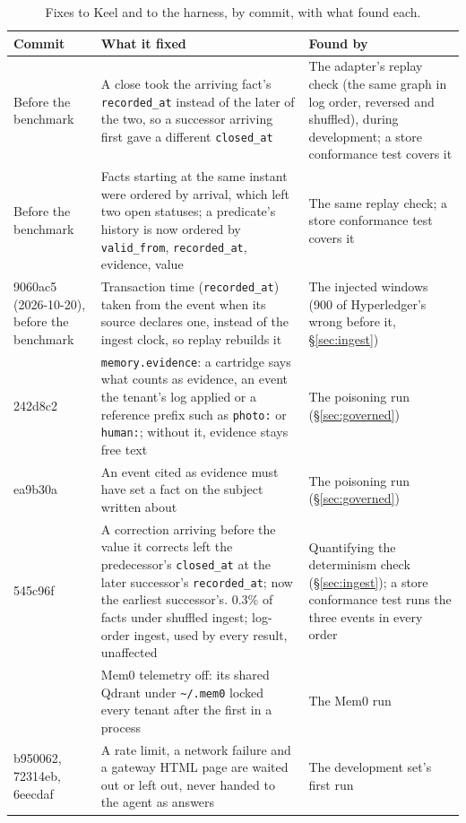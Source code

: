 \documentclass[sigconf, nonacm]{acmart}
\newcommand{\code}[1]{\texttt{#1}}
\begin{document}
\begin{table}[t]
\caption{Fixes to Keel and to the harness, by commit, with what found each.}
\label{tab:fixes}
\centering
\footnotesize
\begin{tabularx}{\textwidth}{P{1.1in} L L}
\toprule
Commit & What it fixed & Found by \\
\midrule
Before the benchmark & A close took the arriving fact's \code{recorded\_at} instead of the later of the two, so a successor arriving first gave a different \code{closed\_at} & The adapter's replay check (the same graph in log order, reversed and shuffled), during development; a store conformance test covers it \\
\addlinespace
Before the benchmark & Facts starting at the same instant were ordered by arrival, which left two open statuses; a predicate's history is now ordered by \code{valid\_from}, \code{recorded\_at}, evidence, value & The same replay check; a store conformance test covers it \\
\addlinespace
9060ac5 (2026-10-20), before the benchmark & Transaction time (\code{recorded\_at}) taken from the event when its source declares one, instead of the ingest clock, so replay rebuilds it & The injected windows (900 of Hyperledger's wrong before it, \S\ref{sec:ingest}) \\
\addlinespace
242d8c2 & \code{memory.evidence}: a cartridge says what counts as evidence, an event the tenant's log applied or a reference prefix such as \code{photo:} or \code{human:}; without it, evidence stays free text & The poisoning run (\S\ref{sec:governed}) \\
\addlinespace
ea9b30a & An event cited as evidence must have set a fact on the subject written about & The poisoning run (\S\ref{sec:governed}) \\
\addlinespace
545c96f & A correction arriving before the value it corrects left the predecessor's \code{closed\_at} at the later successor's \code{recorded\_at}; now the earliest successor's. 0.3\% of facts under shuffled ingest; log-order ingest, used by every result, unaffected & Quantifying the determinism check (\S\ref{sec:ingest}); a store conformance test runs the three events in every order \\
 & Mem0 telemetry off: its shared Qdrant under \code{\textasciitilde/.mem0} locked every tenant after the first in a process & The Mem0 run \\
\addlinespace
b950062, 72314eb, 6eecdaf & A rate limit, a network failure and a gateway HTML page are waited out or left out, never handed to the agent as answers & The development set's first run \\
\bottomrule
\end{tabularx}
\end{table}
\end{document}
